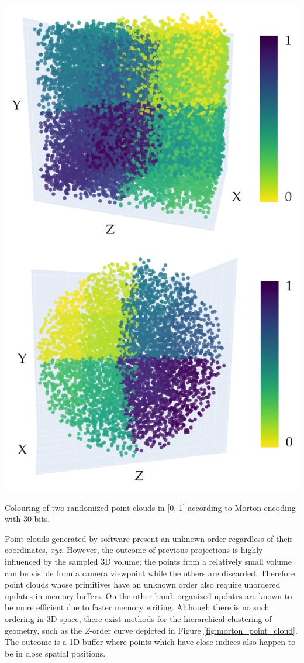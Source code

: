 \begin{marginfigure}[0cm]
    \centering
    \includegraphics[width=\linewidth]{figs/multi_thermal_projection/point_cloud_morton.png}
    \caption{Colouring of two randomized point clouds in [0, 1] according to Morton encoding with 30 bits. }
	\label{fig:morton_point_cloud}
\end{marginfigure}
Point clouds generated by software present an unknown order regardless of their coordinates, \textit{xyz}. However, the outcome of previous projections is highly influenced by the sampled 3D volume; the points from a relatively small volume can be visible from a camera viewpoint while the others are discarded. Therefore, point clouds whose primitives have an unknown order also require unordered updates in memory buffers. On the other hand, organized updates are known to be more efficient due to faster memory writing. Although there is no such ordering in 3D space, there exist methods for the hierarchical clustering of geometry, such as the \textit{Z}-order curve depicted in Figure \ref{fig:morton_point_cloud}. The outcome is a 1D buffer where points which have close indices also happen to be in close spatial positions. 


